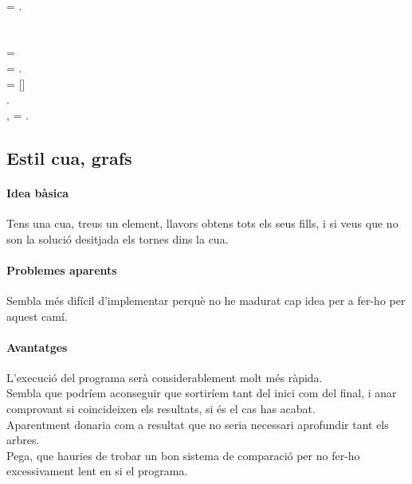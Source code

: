 \documentclass[a4paper,10pt]{article}
\newcommand{\blue}[1]{{\color{blue}#1}}
\newcommand{\red}[1]{{\color{red}#1}}
\begin{document}
\begin{algorithm}
{\\
	{
		\For{\Int $\in$ \Xrange{\TamanyNombreFills} }
		{
			\Auxiliar = \Array[\Int].\Next{}\\
			\If{\Auxiliar}
			{
				\Return{\Auxiliar}
			}
		}
	}
}
\BlankLine
\BlankLine
\funTot{ \funNext{\Anar} }
{
\\
	{
		\Yield{$[$\Anar$]$}
	}
\BlankLine
{}\\
	\VarGenerador = \Generador{\MatriuEntrada, \Anar}\\
	\TamanyNombreFills = \VarGenerador.\Next{}\\
	\Array = []
\BlankLine
{}\\
	\For{\Int $\in$ \Xrange{\TamanyNombreFills}}
	{
		\Array.
	}
\BlankLine
{}\\
	{
		\Yield{\red{False, False}}
		\BlankLine
		\For{\Int $\in$ \Xrange{\TamanyNombreFills} }
		{
			\Auxiliar, \Anar = \Array[\Int].\Next{}\\
			\If{\Auxiliar}
			{
				\Return{\blue{True}, \Auxiliar + $[$\Anar$]$}
			}
		}
	}
}
\end{algorithm}

\subsection{Estil cua, grafs}
\paragraph{Idea bàsica}
Tens una cua, treus un element, llavors obtens tots els seus fills, i si veus que no son la solució desitjada els tornes dins la cua.
\paragraph{Problemes aparents}
Sembla més difícil d'implementar perquè no he madurat cap idea per a fer-ho per aquest camí.
\paragraph{Avantatges}
L'execució del programa serà considerablement molt més ràpida.\\

Sembla que podríem aconseguir que sortiríem tant del inici com del final, i anar comprovant si coincideixen els resultats, si és el cas has
acabat.\\
Aparentment donaria com a resultat que no seria necessari aprofundir tant els arbres.\\
Pega, que hauries de trobar un bon sistema de comparació per no fer-ho excessivament lent en si el programa.
\end{document}
